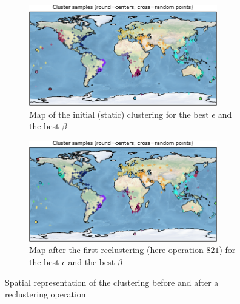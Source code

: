 \documentclass[a4paper,10pt]{article}
\begin{document}
\begin{appendices}
	\begin{figure}[h]
	\centering
	\begin{subfigure}[t]{0.4\textwidth}
		\centering
		\includegraphics[width=0.9\textwidth]{pictures/map_15_75000_15000_0.png}
		\caption{Map of the initial (static) clustering for the best $\epsilon$ and the best $\beta$}
	\end{subfigure} %
	\begin{subfigure}[t]{0.4\textwidth}
		\centering
		\includegraphics[width=0.9\textwidth]{pictures/map_15_75000_15000_821.png}
		\caption{Map after the first reclustering (here operation $821$) for the best $\epsilon$ and the best $\beta$}
\end{subfigure}
\caption{Spatial representation of the clustering before and after a reclustering operation}
\label{maps}
\end{figure}
\begin{figure}[h]
	\centering
	\begin{subfigure}[b]{0.3\textwidth}

\end{subfigure}
\end{figure}
\end{appendices}
\end{document}
